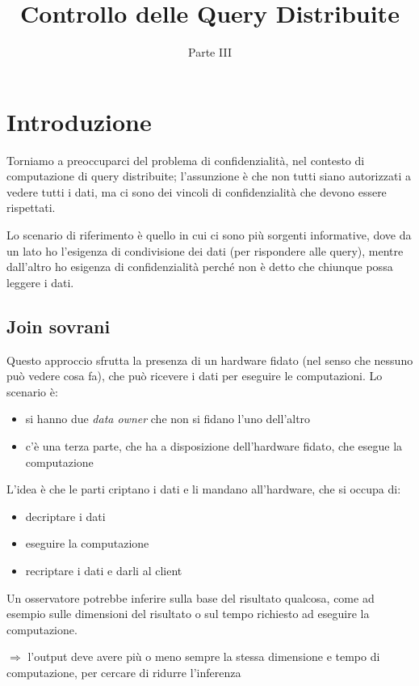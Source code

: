 \documentclass{report}
\title{\huge\textbf{{Controllo delle Query Distribuite}}}
\date{Parte III}
\begin{document}
\maketitle
\tableofcontents
\newpage


\chapter{Introduzione}

Torniamo a preoccuparci del problema di confidenzialità, nel contesto di computazione di 
query distribuite; l'assunzione è che non tutti siano autorizzati a vedere tutti i dati, ma ci 
sono dei vincoli di confidenzialità che devono essere rispettati.

\noindent Lo scenario di riferimento è quello in cui ci sono più sorgenti informative, dove 
da un lato ho l'esigenza di condivisione dei dati (per rispondere alle query), mentre dall'altro 
ho esigenza di confidenzialità perché non è detto che chiunque possa leggere i dati.

\section{Join sovrani}
Questo approccio sfrutta la presenza di un hardware fidato (nel senso che nessuno può vedere 
cosa fa), che può ricevere i dati 
per eseguire le computazioni. Lo scenario è:
\begin{itemize}
    \item si hanno due \textit{data owner} che non si fidano l'uno dell'altro
    \item c'è una terza parte, che ha a disposizione dell'hardware fidato, che esegue la computazione
\end{itemize}

\noindent L'idea è che le parti criptano i dati e li mandano all'hardware, che si occupa di:
\begin{itemize}
    \item decriptare i dati 
    \item eseguire la computazione 
    \item recriptare i dati e darli al client 
\end{itemize}

\noindent Un osservatore potrebbe inferire sulla base del risultato qualcosa, come ad esempio 
sulle dimensioni del risultato o sul tempo richiesto ad eseguire la computazione.

\noindent $\Rightarrow$ l'output deve avere più o meno sempre la stessa dimensione e tempo di computazione, 
per cercare di ridurre l'inferenza
\end{document}
